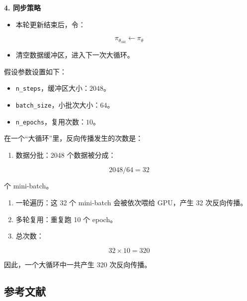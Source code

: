 \textbf{4. 同步策略}

\begin{itemize}
\tightlist
\item
{}
  本轮更新结束后，令：
\end{itemize}

\[
\pi_{\theta_{\mathrm{old}}}\leftarrow\pi_\theta
\]

\begin{itemize}
\tightlist
\item
  清空数据缓冲区，进入下一次大循环。
\end{itemize}

假设参数设置如下：

\begin{itemize}
\tightlist
\item
  \texttt{n\_steps}，缓冲区大小：\(2048\)。
\item
  \texttt{batch\_size}，小批次大小：\(64\)。
\item
  \texttt{n\_epochs}，复用次数：\(10\)。
\end{itemize}

在一个``大循环''里，反向传播发生的次数是：

\begin{enumerate}
\def\labelenumi{\arabic{enumi}.}
\tightlist
\item
{}
  数据分批：2048 个数据被分成：
\end{enumerate}

\[
2048/64=32
\]

个 mini-batch。

\begin{enumerate}
\def\labelenumi{\arabic{enumi}.}
\setcounter{enumi}{1}
\tightlist
\item
  一轮遍历：这 32 个 mini-batch 会被依次喂给 GPU，产生 32 次反向传播。
\item
  多轮复用：重复跑 10 个 epoch。
\item
{}
  总次数：
\end{enumerate}

\[
32\times 10=320
\]

因此，一个大循环中一共产生 320 次反向传播。

\FloatBarrier
{}
\hypertarget{ux53c2ux8003ux6587ux732e-58}{%
\subsection{参考文献}\label{ux53c2ux8003ux6587ux732e-58}}

